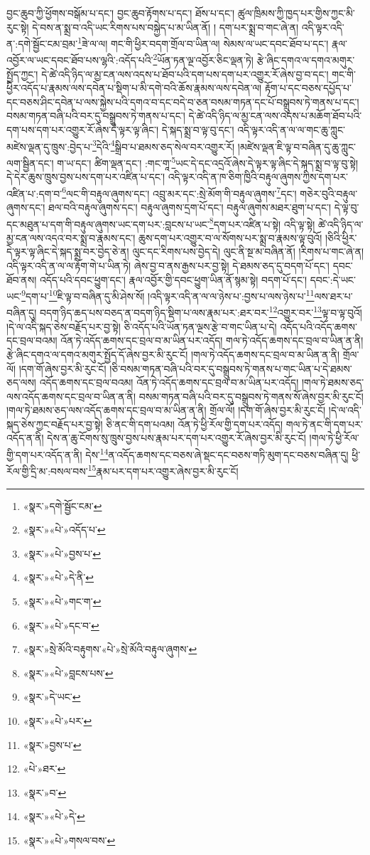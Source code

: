 བྱང་ཆུབ་ཀྱི་ཕྱོགས་བསྒོམ་པ་དང་། བྱང་ཆུབ་རྟོགས་པ་དང་། ཐོས་པ་དང་། ཚུལ་ཁྲིམས་ཀྱི་ཁྱད་པར་གྱིས་ཀྱང་མི་རུང་སྟེ། དེ་བས་ན་སྨྲ་བ་འདི་ཡང་རིགས་པས་བསྐྱེད་པ་མ་ཡིན་ནོ། །
དག་པར་སྨྲ་བ་གང་ཞེ་ན། འདི་ལྟར་འདི་ན་:དགེ་སྦྱོང་ངམ་བྲམ་\footnote{«སྣར་»དགེ་སྦྱོང་ངམ་}ཟེ་ལ་ལ། གང་གི་ཕྱིར་བདག་གྲོལ་བ་ཡིན་ལ། སེམས་ལ་ཡང་དབང་ཐོབ་པ་དང་། རྣལ་འབྱོར་ལ་ཡང་དབང་ཐོབ་པས་ལྷའི་:འདོད་པའི་\footnote{«སྣར་»«པེ་»འདོད་པ་}ཡོན་ཏན་ལྔ་འབྱོར་ཅིང་ལྡན་ཏེ། རྩེ་ཞིང་དགའ་ལ་དགའ་མགུར་སྤྱོད་ཀྱང་། དེ་ཚེ་འདི་ཉིད་ལ་མྱ་ངན་ལས་འདས་པ་ཐོབ་པའི་དག་པས་དག་པར་འགྱུར་རོ་ཞེས་བྱ་བ་དང་། གང་གི་ཕྱིར་འདོད་པ་རྣམས་ལས་དབེན་པ་སྡིག་པ་མི་དགེ་བའི་ཆོས་རྣམས་ལས་དབེན་ལ། རྟོག་པ་དང་བཅས་དཔྱོད་པ་དང་བཅས་ཤིང་དབེན་པ་ལས་སྐྱེས་པའི་དགའ་བ་དང་བདེ་བ་ཅན་བསམ་གཏན་དང་པོ་བསྒྲུབས་ཏེ་གནས་པ་དང་། བསམ་གཏན་བཞི་པའི་བར་དུ་བསྒྲུབས་ཏེ་གནས་པ་དང་། དེ་ཚེ་འདི་ཉིད་ལ་མྱ་ངན་ལས་འདས་པ་མཆོག་ཐོབ་པའི་དག་པས་དག་པར་འགྱུར་རོ་ཞེས་དེ་ལྟར་ལྟ་ཞིང་། དེ་སྐད་སྨྲ་བ་ལྟ་བུ་དང་། འདི་ལྟར་འདི་ན་ལ་ལ་གང་ཆུ་ཀླུང་མཛེས་ལྡན་དུ་ཁྲུས་:བྱེད་པ་\footnote{«སྣར་»«པེ་»བྱས་པ་}དེའི་\footnote{«སྣར་»«པེ་»དེ་ནི་}སྒྲིབ་པ་ཐམས་ཅད་སེལ་བར་འགྱུར་རོ། །མཛེས་ལྡན་ཇི་ལྟ་བ་བཞིན་དུ་ཆུ་ཀླུང་ལག་སྦྱིན་དང་། ག་ཡ་དང་། ཚིག་ལྡན་དང་། :གང་གཱ་\footnote{«སྣར་»«པེ་»གང་ག་}ཡང་དེ་དང་འདྲའོ་ཞེས་དེ་ལྟར་ལྟ་ཞིང་དེ་སྐད་སྨྲ་བ་ལྟ་བུ་སྟེ། དེ་དེར་ཆུས་ཁྲུས་བྱས་པས་དག་པར་འཛིན་པ་དང་། འདི་ལྟར་འདི་ན་ཁ་ཅིག་ཁྱིའི་བརྟུལ་ཞུགས་ཀྱིས་དག་པར་འཛིན་པ་:དག་བ་\footnote{«སྣར་»«པེ་»དང་བ་}ལང་གི་བརྟུལ་ཞུགས་དང་། འབྲུ་མར་དང་:སྲེ་མོག་གི་བརྟུལ་ཞུགས་\footnote{«སྣར་»སྲེ་མོའི་བརྟུགས་«པེ་»སྲེ་མོའི་བརྟུལ་ཞུགས་}དང་། གཅེར་བུའི་བརྟུལ་ཞུགས་དང་། ཐལ་བའི་བརྟུལ་ཞུགས་དང་། བརྟུལ་ཞུགས་དྲག་པོ་དང་། བརྟུལ་ཞུགས་མཐར་ཐུག་པ་དང་། དེ་ལྟ་བུ་དང་མཐུན་པ་དག་གི་བརྟུལ་ཞུགས་ཡང་དག་པར་:བླངས་པ་ཡང་\footnote{«སྣར་»«པེ་»བླངས་པས་}དག་པར་འཛིན་པ་སྟེ། འདི་ལྟ་སྟེ། ཚེ་འདི་ཉིད་ལ་མྱ་ངན་ལས་འདའ་བར་སྨྲ་བ་རྣམས་དང་། ཆུས་དག་པར་འགྱུར་བ་ལ་སོགས་པར་སྨྲ་བ་རྣམས་ལྟ་བུའོ། །ཅིའི་ཕྱིར་དེ་ལྟར་ལྟ་ཞིང་དེ་སྐད་སྨྲ་བར་བྱེད་ཅེ་ན། ལུང་དང་རིགས་པས་བྱེད་དེ། ལུང་ནི་སྔ་མ་བཞིན་ནོ། །རིགས་པ་གང་ཞེ་ན། འདི་ལྟར་འདི་ན་ལ་ལ་རྟོག་གེ་པ་ཡིན་ཏེ། ཞེས་བྱ་བ་ནས་རྒྱས་པར་བྱ་སྟེ། དེ་ཐམས་ཅད་དུ་བདག་པོ་དང་། དབང་ཐོབ་ནས། འདོད་པའི་དབང་ཕྱུག་དང་། རྣལ་འབྱོར་གྱི་དབང་ཕྱུག་ཡིན་ནོ་སྙམ་སྟེ། བདག་པོ་དང་། དབང་:དེ་ཡང་ཡང་\footnote{«སྣར་»དེ་ཡང་}དག་པ་\footnote{«སྣར་»«པེ་»པར་}ཇི་ལྟ་བ་བཞིན་དུ་མི་ཤེས་སོ། །འདི་ལྟར་འདི་ན་ལ་ལ་ཉེས་པ་:བྱས་པ་ལས་ཉེས་པ་\footnote{«སྣར་»བྱས་པ་}ལས་ཐར་པ་བཞིན་དུ། བདག་ཉིད་ཆད་པས་བཅད་ན་བདག་ཉིད་སྡིག་པ་ལས་རྣམ་པར་:ཐར་བར་\footnote{«པེ་»ཐར་}འགྱུར་བར་\footnote{«སྣར་»བ་}ལྟ་བ་ལྟ་བུའོ། །དེ་ལ་འདི་སྐད་ཅེས་བརྗོད་པར་བྱ་སྟེ། ཅི་འདོད་པའི་ཡོན་ཏན་ལྔས་རྩེ་བ་གང་ཡིན་པ་དེ། འདོད་པའི་འདོད་ཆགས་དང་བྲལ་བའམ། འོན་ཏེ་འདོད་ཆགས་དང་བྲལ་བ་མ་ཡིན་པར་འདོད། གལ་ཏེ་འདོད་ཆགས་དང་བྲལ་བ་ཡིན་ན་ནི། རྩེ་ཞིང་དགའ་ལ་དགའ་མགུར་སྤྱོད་དོ་ཞེས་བྱར་མི་རུང་ངོ། །གལ་ཏེ་འདོད་ཆགས་དང་བྲལ་བ་མ་ཡིན་ན་ནི། གྲོལ་ལོ། །དག་གོ་ཞེས་བྱར་མི་རུང་ངོ། །ཅི་བསམ་གཏན་བཞི་པའི་བར་དུ་བསྒྲུབས་ཏེ་གནས་པ་གང་ཡིན་པ་དེ་ཐམས་ཅད་ལས། འདོད་ཆགས་དང་བྲལ་བའམ། འོན་ཏེ་འདོད་ཆགས་དང་བྲལ་བ་མ་ཡིན་པར་འདོད། །གལ་ཏེ་ཐམས་ཅད་ལས་འདོད་ཆགས་དང་བྲལ་བ་ཡིན་ན་ནི། བསམ་གཏན་བཞི་པའི་བར་དུ་བསྒྲུབས་ཏེ་གནས་སོ་ཞེས་བྱར་མི་རུང་ངོ། །གལ་ཏེ་ཐམས་ཅད་ལས་འདོད་ཆགས་དང་བྲལ་བ་མ་ཡིན་ན་ནི། གྲོལ་ལོ། །དག་གོ་ཞེས་བྱར་མི་རུང་ངོ། །དེ་ལ་འདི་སྐད་ཅེས་ཀྱང་བརྗོད་པར་བྱ་སྟེ། ཅི་ནང་གི་དག་པའམ། འོན་ཏེ་ཕྱི་རོལ་གྱི་དག་པར་འདོད། གལ་ཏེ་ནང་གི་དག་པར་འདོད་ན་ནི། དེས་ན་ཆུ་ངོགས་སུ་ཁྲུས་བྱས་པས་རྣམ་པར་དག་པར་འགྱུར་རོ་ཞེས་བྱར་མི་རུང་ངོ། །གལ་ཏེ་ཕྱི་རོལ་གྱི་དག་པར་འདོད་ན་ནི། དེས་\footnote{«སྣར་»«པེ་»དེ་}ན་འདོད་ཆགས་དང་བཅས་ཞེ་སྡང་དང་བཅས་གཏི་མུག་དང་བཅས་བཞིན་དུ། ཕྱི་རོལ་གྱི་དྲི་མ་:བསལ་བས་\footnote{«སྣར་»«པེ་»གསལ་བས་}རྣམ་པར་དག་པར་འགྱུར་ཞེས་བྱར་མི་རུང་ངོ། 